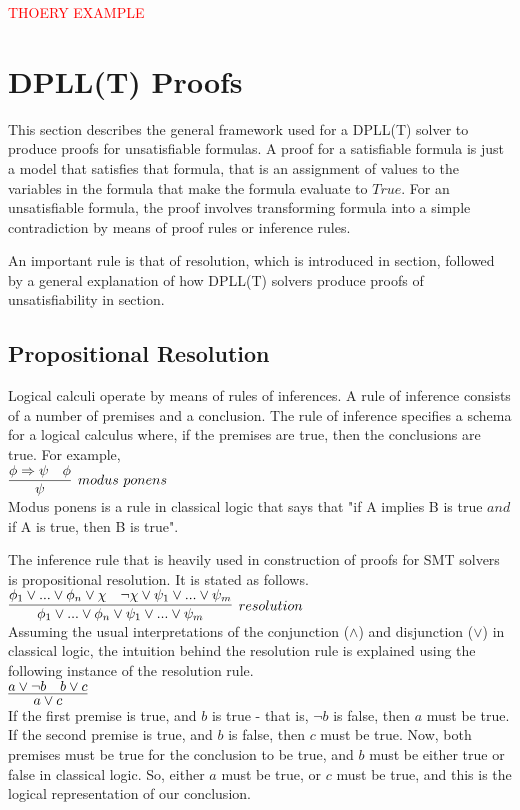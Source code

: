 \documentclass{article}
\begin{document}
\textcolor{red}{THOERY EXAMPLE}

\section{DPLL(T) Proofs}
\label{sec:proofs}
This section describes the general framework used for a 
DPLL(T) solver to produce proofs for unsatisfiable formulas. 
A proof for a satisfiable formula is just a model that 
satisfies that formula, that is an assignment of values to 
the variables in the formula that make the formula evaluate 
to $True$. For an unsatisfiable formula, the proof involves 
transforming formula into a simple contradiction by means 
of proof rules or inference rules. 

An important rule is that of resolution, which is introduced 
in section, followed by a general explanation of how DPLL(T) 
solvers produce proofs of unsatisfiability in section.

\subsection{Propositional Resolution}
\label{sec:res}
Logical calculi operate by means of rules of inferences. A
rule of inference consists of a number of premises and a 
conclusion. The rule of inference specifies a schema for a 
logical calculus where, if the premises are true, then 
the conclusions are true. For example, \\
$\infer[modus\ ponens]{\psi}{\phi \Rightarrow \psi & \phi}$ \\
Modus ponens is a rule in classical logic that says that 
"if A implies B is true $and$ if A is true, then B is true".

The inference rule that is heavily used in construction of 
proofs for SMT solvers is propositional resolution. It is
stated as follows. \\
$\infer[resolution]{\phi_1 \lor ... \lor \phi_n \lor \psi_1 \lor ... \lor \psi_m}
{\phi_1 \lor ... \lor \phi_n \lor \chi & \neg \chi \lor \psi_1 \lor ... \lor \psi_m}$ \\

Assuming the usual interpretations of the conjunction
($\land$) and disjunction ($\lor$) in classical logic, the 
intuition behind the resolution rule is explained using the 
following instance of the resolution rule. \\
$\infer{a \lor c}{a \lor \neg b & b \lor c}$ \\
If the first premise is true, and $b$ is true - that is, 
$\neg b$ is false, then $a$ must be true. If the second 
premise is true, and $b$ is false, then $c$ must be true.
Now, both premises must be true for the conclusion to be true, 
and $b$ must be either true or false in classical logic. 
So, either $a$ must be true, or $c$ must be true, and this 
is the logical representation of our conclusion.
\end{document}
